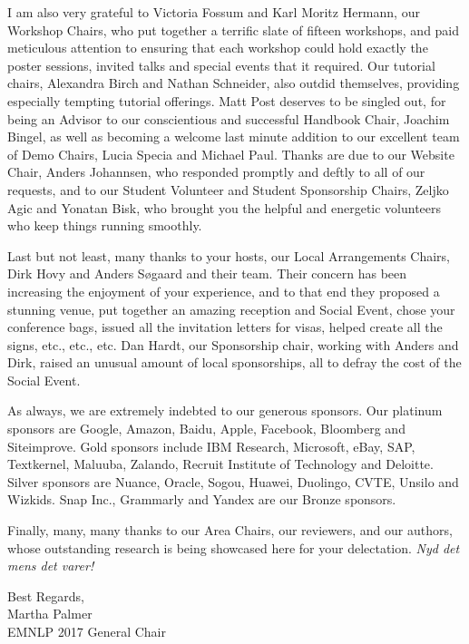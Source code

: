 \documentclass[11pt]{article}
\begin{document}
I am also very grateful to Victoria Fossum and Karl Moritz Hermann, our Workshop Chairs, who put together a terrific slate of fifteen workshops, and paid meticulous attention to ensuring that each workshop could hold exactly the poster sessions, invited talks and special events that it required.  Our tutorial chairs, Alexandra Birch and Nathan Schneider, also outdid themselves, providing especially tempting tutorial offerings.  Matt Post deserves to be singled out, for being an Advisor to our conscientious and successful Handbook Chair, Joachim Bingel, as well as becoming a welcome last minute addition to our excellent team of Demo Chairs, Lucia Specia and Michael Paul.  Thanks are due to our Website Chair, Anders Johannsen, who responded promptly and deftly to all of our requests, and to our Student Volunteer and Student Sponsorship Chairs, Zeljko Agic and Yonatan Bisk, who brought you the helpful and energetic volunteers who keep things running smoothly.

Last but not least, many thanks to your hosts, our Local Arrangements Chairs, Dirk Hovy and Anders Søgaard and their team.  Their concern has been increasing the enjoyment of your experience, and to that end they proposed a stunning venue, put together an amazing reception and Social Event, chose your conference bags, issued all the invitation letters for visas, helped create all the signs, etc., etc., etc.  Dan Hardt, our Sponsorship chair, working with Anders and Dirk, raised an unusual amount of local sponsorships, all to defray the cost of the Social Event.

As always, we are extremely indebted to our generous sponsors. Our platinum sponsors are Google, Amazon, Baidu, Apple, Facebook, Bloomberg and Siteimprove.  Gold sponsors include IBM Research, Microsoft, eBay, SAP, Textkernel, Maluuba, Zalando, Recruit Institute of Technology and Deloitte.  Silver sponsors are Nuance, Oracle, Sogou, Huawei, Duolingo, CVTE, Unsilo and Wizkids. Snap Inc., Grammarly and Yandex are our Bronze sponsors.

Finally, many, many thanks to our Area Chairs, our reviewers, and our authors, whose outstanding research is being showcased here for your delectation. \textit{Nyd det mens det varer!}

\noindent
Best Regards,\\
Martha Palmer\\
EMNLP 2017 General Chair

\pagebreak
\end{document}
